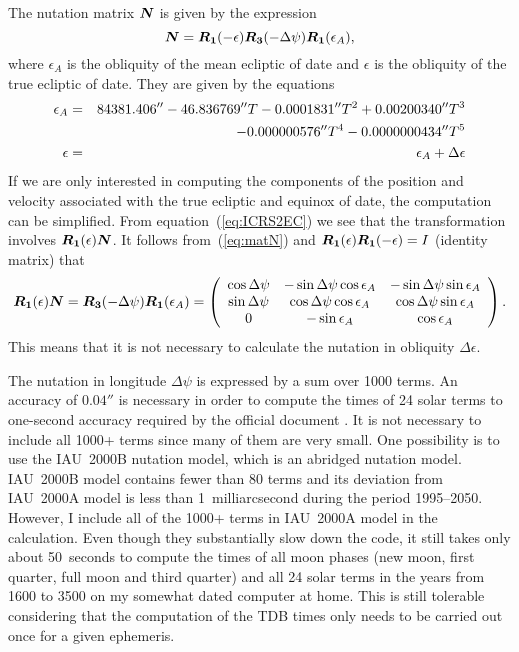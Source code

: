 \documentclass[12pt]{article}
\newcommand \beq {\begin{equation}}
\newcommand \eeq {\end{equation}}
\newcommand \beqn {\begin{eqnarray}}
\newcommand \eeqn {\end{eqnarray}}
\newcommand{\ve}[1]{\mbox{\boldmath $#1$}}
\begin{document}
\begin{CJK}{UTF8}{bkai}
The nutation matrix $\ve{N}$ is given by the expression 
\beq
  \ve{N} = \ve{R_1}(-\epsilon) \ve{R_3}(-\Delta \psi) \ve{R_1}(\epsilon_A) ,
\label{eq:matN}
\eeq
where $\epsilon_A$ is the obliquity of the mean ecliptic of date and $\epsilon$ is the
obliquity of the true ecliptic of date. They are given by the equations
\beqn
  \epsilon_A &=& 84381.406'' - 46.836769'' T - 0.0001831'' T^2 + 0.00200340'' T^3 \cr
&& - 0.000000576'' T^4 - 0.0000000434'' T^5 \label{eq:epsA} \\
  \epsilon &=& \epsilon_A + \Delta \epsilon  \label{eq:epsilon}
\eeqn
If we are only interested in computing the components of the position 
and velocity associated 
with the true ecliptic and equinox of date, the computation can be simplified. 
From equation~(\ref{eq:ICRS2EC}) we see that the transformation involves 
$\ve{R_1}(\epsilon) \ve{N}$. 
It follows from~(\ref{eq:matN}) and $\ve{R_1}(\epsilon) \ve{R_1}(-\epsilon)=I$ (identity 
matrix) that 
\beq
  \ve{R_1}(\epsilon) \ve{N} = \ve{R_3}(-\Delta \psi) \ve{R_1}(\epsilon_A) = 
\left( \begin{array}{ccc} 
\cos \Delta \psi & -\sin \Delta \psi \cos \epsilon_A & -\sin \Delta \psi \sin \epsilon_A \\
\sin \Delta \psi & \cos \Delta \psi \cos \epsilon_A & \cos \Delta \psi \sin \epsilon_A \\ 
0 & -\sin \epsilon_A & \cos \epsilon_A \end{array} \right) .
\label{eq:RN}
\eeq
This means that it is not necessary to calculate the nutation in obliquity 
$\Delta \epsilon$.

The nutation in longitude $\Delta \psi$ is expressed by a sum over 1000 terms. 
An accuracy of $0.04''$ is necessary in order to compute the times of 24 solar 
terms to one-second accuracy required by the official document \cite{pmo17}. 
It is not necessary to include all 1000+ terms since many of them are very small. 
One possibility is to use the IAU~2000B nutation model, which is an abridged nutation model. 
IAU~2000B model contains fewer than 80 terms and its deviation from IAU~2000A model 
is less than 1~milliarcsecond  during the period 1995--2050. 
However, I include all of the 1000+ terms in IAU~2000A model 
in the calculation. Even though they substantially slow down the code, 
it still takes only about 50~seconds to compute the times of all moon phases 
(new moon, first quarter, full moon and third quarter) and all 24 solar terms 
in the years from 1600 to 3500 on my somewhat dated computer at home. This 
is still tolerable considering that 
the computation of the TDB times only needs to be carried out once for 
a given ephemeris.


\end{CJK}
\end{document}
